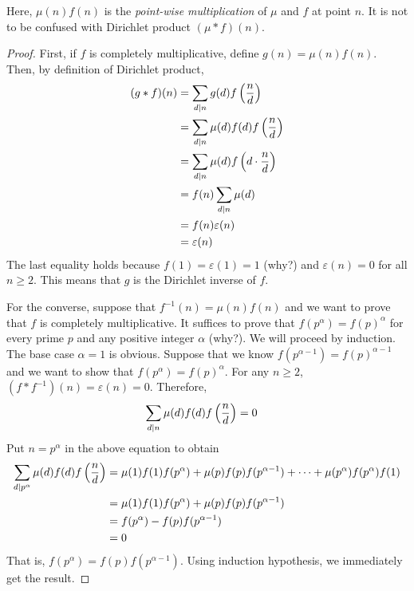 	\begin{note}
		Here, $\mu(n)f(n)$ is the \textit{point-wise multiplication} of $\mu$ and $f$ at point $n$. It is not to be confused with Dirichlet product $(\mu \ast f)(n)$.
	\end{note}

	\begin{proof}
		First, if $f$ is completely multiplicative, define $g(n) = \mu(n) f(n)$. Then, by definition of Dirichlet product,
			\begin{align*}
				(g \ast f)(n) & = \sum_{d\mid n} g(d) f\left(\frac{n}{d}\right)\\
					  & = \sum_{d\mid n} \mu(d) f(d)f\left(\frac{n}{d}\right)\\
					  & = \sum_{d\mid n} \mu(d)f\left(d \cdot \frac{n}{d}\right)\\
					  & = f(n) \sum_{d\mid n} \mu(d)\\
					  & = f(n) \varepsilon(n)\\
					  & = \varepsilon(n)
			\end{align*}
		The last equality holds because $f(1)=\varepsilon(1)=1$ (why?) and $\varepsilon(n)=0$ for all $n \geq 2$. This means that $g$ is the Dirichlet inverse of $f$.

		For the converse, suppose that $f^{-1}(n) = \mu(n) f(n)$ and we want to prove that $f$ is completely multiplicative. It suffices to prove that $f(p^\alpha)=f(p)^\alpha$ for every prime $p$ and any positive integer $\alpha$ (why?). We will proceed by induction. The base case $\alpha =1$ is obvious. Suppose that we know $f(p^{\alpha-1})=f(p)^{\alpha-1}$ and we want to show that $f(p^\alpha)=f(p)^\alpha$. For any $n \geq 2$, $(f\ast f^{-1})(n)=\varepsilon(n)=0$. Therefore,
			\begin{align*}
				\sum_{d\mid n} \mu(d) f(d)f\left(\frac{n}{d}\right) &= 0
			\end{align*}
		Put $n=p^\alpha$ in the above equation to obtain
			\begin{align*}
				\sum_{d\mid p^\alpha} \mu(d) f(d)f\left(\frac{n}{d}\right)
					& = \mu(1)f(1)f(p^\alpha) + \mu(p)f(p)f(p^{\alpha -1}) + \cdots +\mu(p^\alpha) f(p^\alpha)f(1)\\
					& = \mu(1)f(1)f(p^\alpha) + \mu(p)f(p)f(p^{\alpha -1})\\
					& = f(p^\alpha) - f(p) f(p^{\alpha -1}) \\
					& = 0
			\end{align*}
		That is, $f(p^\alpha) = f(p) f(p^{\alpha -1})$. Using induction hypothesis, we immediately get the result.
	\end{proof}




